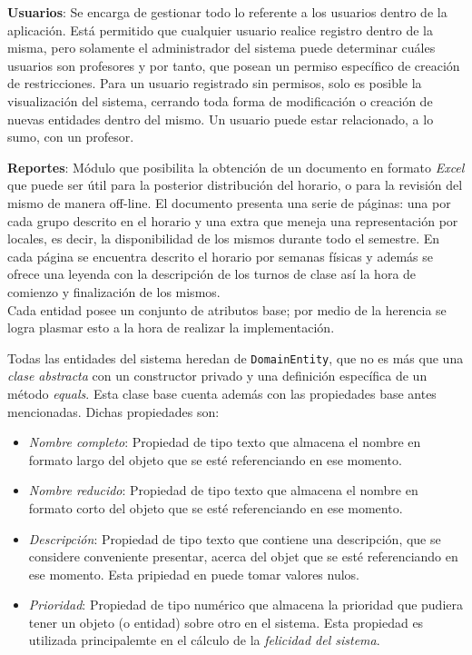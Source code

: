 \textbf{Usuarios}: Se encarga de gestionar todo lo referente a los usuarios dentro de la aplicación. Está permitido que cualquier usuario realice registro dentro de la misma, pero solamente el administrador del sistema puede determinar cuáles usuarios son profesores y por tanto, que posean un permiso específico de creación de restricciones. Para un usuario registrado sin permisos, solo es posible la visualización del sistema, cerrando toda forma de modificación o creación de nuevas entidades dentro del mismo. Un usuario puede estar relacionado, a lo sumo, con un profesor. 

\textbf{Reportes}: Módulo que posibilita la obtención de un documento en formato \textit{Excel} que puede ser útil para la posterior distribución del horario, o para la revisión del mismo de manera off-line. El documento presenta una serie de páginas: una por cada grupo descrito en el horario y una extra que meneja una representación por locales, es decir, la disponibilidad de los mismos durante todo el semestre. En cada página se encuentra descrito el horario por semanas físicas y además se ofrece una leyenda con la descripción de los turnos de clase así la hora de comienzo y finalización de los mismos.\\

Cada entidad posee un conjunto de atributos base; por medio de la herencia se logra plasmar esto a la hora de realizar la implementación. 

Todas las entidades del sistema heredan de \texttt{DomainEntity}, que no es más que una \textit{clase abstracta} con un constructor privado y una definición específica de un método \textit{equals}. Esta clase base cuenta además con las propiedades base antes mencionadas. Dichas propiedades son:

\label{props:base}
\begin{itemize}
	\item \textsl{Nombre completo}: Propiedad de tipo texto que almacena el nombre en formato largo del objeto que se esté referenciando en ese momento. 
	\item \textsl{Nombre reducido}: Propiedad de tipo texto que almacena el nombre en formato corto del objeto que se esté referenciando en ese momento. 
	\item \textsl{Descripción}: Propiedad de tipo texto que contiene una descripción, que se considere conveniente presentar, acerca del objet que se esté referenciando en ese momento. Esta pripiedad en puede tomar valores nulos.
	\item \textsl{Prioridad}: Propiedad de tipo numérico que almacena la prioridad que pudiera tener un objeto (o entidad) sobre otro en el sistema. Esta propiedad es utilizada principalemte en el cálculo de la \textit{felicidad del sistema}.

\end{itemize}



